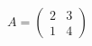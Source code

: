 \documentclass[preview]{standalone}
\begin{document}
\begin{center}
$ A = \begin{pmatrix} 2 & 3 \\ 1 & 4 \end{pmatrix} $
\end{center}
\end{document}
